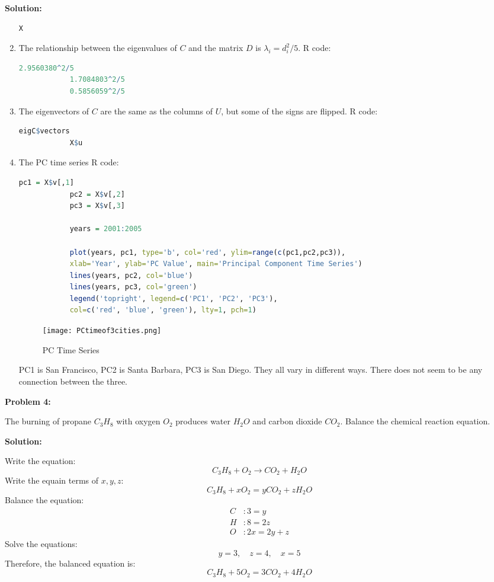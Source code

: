 \documentclass[12pt]{article}
\newenvironment{problem}[1]{
    \textbf{Problem #1:}
}{
    \rmfamily \vspace{1em}
}
\newenvironment{solution}{
    \textbf{Solution:}
    
}{
    
    \vspace{2em}
}
\begin{document}
\begin{solution}
\begin{enumerate}[label=(\alph*)]
\begin{lstlisting}[language=R]
            X
        \end{lstlisting}
        \item The relationship between the eigenvalues of $C$ and the matrix $D$ is $\lambda_i = d_i^2/5$.
        R code:
        \begin{lstlisting}[language=R]
            2.9560380^2/5
            1.7084803^2/5
            0.5856059^2/5
        \end{lstlisting}
        \item The eigenvectors of $C$ are the same as the columns of $U$, but some of the signs are flipped.
        R code:
        \begin{lstlisting}[language=R]
            eigC$vectors
            X$u
        \end{lstlisting}
        \item The PC time series R code:
        \begin{lstlisting}[language=R]
            pc1 = X$v[,1]
            pc2 = X$v[,2]
            pc3 = X$v[,3]

            years = 2001:2005

            plot(years, pc1, type='b', col='red', ylim=range(c(pc1,pc2,pc3)), 
            xlab='Year', ylab='PC Value', main='Principal Component Time Series')
            lines(years, pc2, col='blue')
            lines(years, pc3, col='green')
            legend('topright', legend=c('PC1', 'PC2', 'PC3'), 
            col=c('red', 'blue', 'green'), lty=1, pch=1)
        \end{lstlisting}
        \begin{figure}[H]
            \centering
            \texttt{[image: PCtimeof3cities.png]}
            \caption{PC Time Series}
        \end{figure}
        PC1 is San Francisco, PC2 is Santa Barbara, PC3 is San Diego. They all vary in different ways. There does not seem to be any connection between the three.
    \end{enumerate}
\end{solution}

\begin{problem}{4}
    The burning of propane \(C_3H_8\) with oxygen \(O_2\) produces water \(H_2O\) and carbon dioxide \(CO_2\). Balance the chemical reaction equation.
\end{problem}

\begin{solution}
    Write the equation:
    \[
    C_3H_8 + O_2 \rightarrow CO_2 + H_2O
    \]
    Write the equain terms of \(x, y, z\):
    \[
    C_3H_8 + xO_2 = yCO_2 + zH_2O
    \]
    Balance the equation:
    \[
        \begin{aligned}
            C&: 3 = y \\
            H&: 8 = 2z \\
            O&: 2x = 2y + z
        \end{aligned}
    \]
    Solve the equations:
    \[
    y = 3, \quad z = 4, \quad x = 5
    \]
    Therefore, the balanced equation is:
    \[
    C_3H_8 + 5O_2 = 3CO_2 + 4H_2O
    \]
\end{solution}
\end{document}
